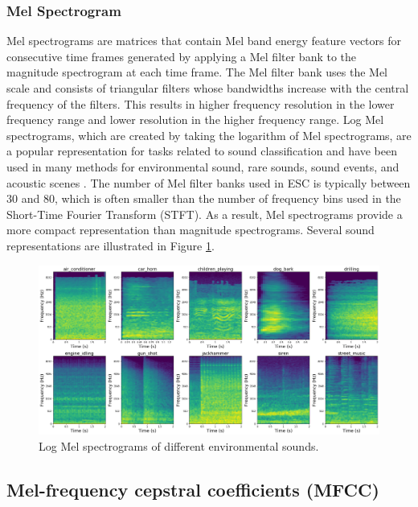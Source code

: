 \subsubsection{Mel Spectrogram}

 Mel spectrograms are matrices that contain Mel band energy feature vectors for consecutive time frames generated by applying a Mel filter bank to the magnitude spectrogram at each time frame. The Mel filter bank uses the Mel scale and consists of triangular filters whose bandwidths increase with the central frequency of the filters. This results in higher frequency resolution in the lower frequency range and lower resolution in the higher frequency range. Log Mel spectrograms, which are created by taking the logarithm of Mel spectrograms, are a popular representation for tasks related to sound  classification and have been used in many  methods for environmental sound, rare sounds, sound events, and acoustic scenes \cite{DCASE2020Workshop, DCASE2019Workshop, DCASE2022Workshop, dcase2022, DCASE2021Challenge}. The number of Mel filter banks used in ESC is typically between 30 and 80, which is often smaller than the number of frequency bins used in the Short-Time Fourier Transform (STFT). As a result, Mel spectrograms provide a more compact representation than magnitude spectrograms. Several sound representations are illustrated in Figure \ref{fig:melspectrograms}.

\begin{figure}[htbp]
   \begin{center}
      \includegraphics[width=1\linewidth]{Chapitre1/figures/Melspecs.png}
   \end{center}
   \caption
   {Log Mel spectrograms of different environmental sounds.}
   \label{fig:melspectrograms}
\end{figure}



\subsection{Mel-frequency cepstral coefficients (MFCC)}

